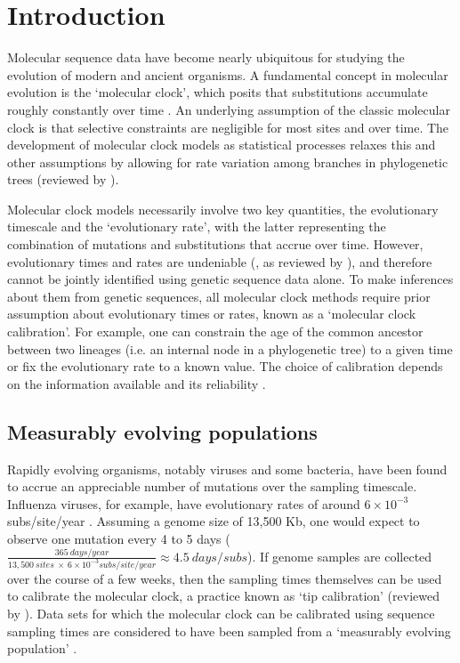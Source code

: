 \documentclass[11pt]{article}
\begin{document}
\section{Introduction}
Molecular sequence data have become nearly ubiquitous for studying the evolution of modern and ancient organisms. A fundamental concept in molecular evolution is the `molecular clock', which posits that substitutions accumulate roughly constantly over time \citep{zuckerkandl1965evolutionary}. An underlying assumption of the classic molecular clock is that selective constraints are negligible for most sites and over time. The development of molecular clock models as statistical processes relaxes this and other assumptions by allowing for rate variation among branches in phylogenetic trees (reviewed by \cite{ho2014molecular}).

Molecular clock models necessarily involve two key quantities, the evolutionary timescale and the `evolutionary rate', with the latter representing the combination of mutations and substitutions that accrue over time. However, evolutionary times and rates are undeniable (\cite{dos2013unbearable}, as reviewed by \cite{bromham2018bayesian}), and therefore cannot be jointly identified using genetic sequence data alone. To make inferences about them from genetic sequences, all molecular clock methods require prior assumption about evolutionary times or rates, known as a `molecular clock calibration'. For example, one can constrain the age of the common ancestor between two lineages (i.e. an internal node in a phylogenetic tree) to a given time or fix the evolutionary rate to a known value. The choice of calibration depends on the information available and its reliability \citep{warnock2012exploring, duchene2014impact}. 

\subsection{Measurably evolving populations}
Rapidly evolving organisms, notably viruses and some bacteria, have been found to accrue an appreciable number of mutations over the sampling timescale. Influenza viruses, for example, have evolutionary rates of around $6\times10^{-3}$ subs/site/year \citep{ghafari2021purifying, sanjuan2012molecular}. Assuming a genome size of 13,500 Kb, one would expect to observe one mutation every 4 to 5 days ($\frac{365\ days/year}{13,500\ sites\ \times\ 6\times10^{-3}subs/site/year}\approx4.5\ days/subs$). If genome samples are collected over the course of a few weeks, then the sampling times themselves can be used to calibrate the molecular clock, a practice known as `tip calibration' (reviewed by \cite{rieux2016inferences}). Data sets for which the molecular clock can be calibrated using sequence sampling times are considered to have been sampled from a `measurably evolving population' \citep{drummond2003measurably}.
\end{document}
